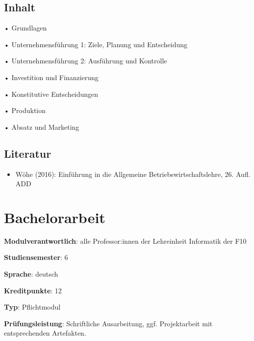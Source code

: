 \hypertarget{inhaltpathlabelmi-2017modulbeschreibungen-bachelorba_bwl1}{%
\section*{Inhalt\label{/mi-2017/modulbeschreibungen-bachelor/BA_BWL1}}\label{inhaltpathlabelmi-2017modulbeschreibungen-bachelorba_bwl1}}

• Grundlagen

• Unternehmensführung 1: Ziele, Planung und Entscheidung

• Unternehmensführung 2: Ausführung und Kontrolle

• Investition und Finanzierung

• Konstitutive Entscheidungen

• Produktion

• Absatz und Marketing

\hypertarget{literaturpathlabelmi-2017modulbeschreibungen-bachelorba_bwl1}{%
\section*{Literatur\label{/mi-2017/modulbeschreibungen-bachelor/BA_BWL1}}\label{literaturpathlabelmi-2017modulbeschreibungen-bachelorba_bwl1}}

\begin{itemize}
\tightlist
\item
  Wöhe (2016): Einführung in die Allgemeine Betriebswirtschaftslehre,
  26. Aufl. ADD
\end{itemize}

\hypertarget{bachelorarbeitpathlabelmi-2017modulbeschreibungen-bachelorba_bachelorarbeit}{%
\chapter{Bachelorarbeit\label{/mi-2017/modulbeschreibungen-bachelor/BA_Bachelorarbeit}}\label{bachelorarbeitpathlabelmi-2017modulbeschreibungen-bachelorba_bachelorarbeit}}

\begin{modulHead}
\textbf{Modulverantwortlich}: alle Professor:innen
der Lehreinheit Informatik der
F10
\end{modulHead}
\begin{modulHead}
\textbf{Studiensemester}:
6
\end{modulHead}
\begin{modulHead}
\textbf{Sprache}:
deutsch
\end{modulHead}
\begin{modulHead}
\textbf{Kreditpunkte}:
12
\end{modulHead}
\begin{modulHead}
\textbf{Typ}:
Pflichtmodul
\end{modulHead}
\begin{modulHead}
\textbf{Prüfungsleistung}:
Schriftliche Ausarbeitung, ggf. Projektarbeit mit entsprechenden
Artefakten.
\end{modulHead}


